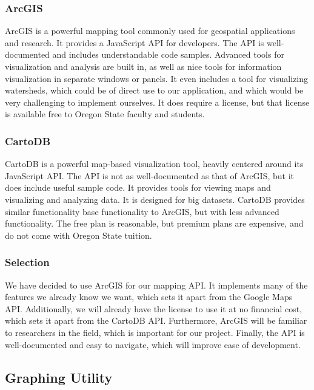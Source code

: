 \subsubsection{ArcGIS}
ArcGIS is a powerful mapping tool commonly used for geospatial applications and research. 
It provides a JavaScript API for developers. 
The API is well-documented and includes understandable code samples. 
Advanced tools for visualization and analysis are built in, as well as nice tools for information visualization in separate windows or panels. 
It even includes a tool for visualizing watersheds, which could be of direct use to our application, and which would be very challenging to implement ourselves. 
It does require a license, but that license is available free to Oregon State faculty and students. 

\subsubsection{CartoDB}
CartoDB is a powerful map-based visualization tool, heavily centered around its JavaScript API. 
The API is not as well-documented as that of ArcGIS, but it does include useful sample code. 
It provides tools for viewing maps and visualizing and analyzing data. 
It is designed for big datasets. 
CartoDB provides similar functionality base functionality to ArcGIS, but with less advanced functionality. 
The free plan is reasonable, but premium plans are expensive, and do not come with Oregon State tuition.

\subsubsection{Selection}
We have decided to use ArcGIS for our mapping API. 
It implements many of the features we already know we want, which sets it apart from the Google Maps API. 
Additionally, we will already have the license to use it at no financial cost, which sets it apart from the CartoDB API. 
Furthermore, ArcGIS will be familiar to researchers in the field, which is important for our project. 
Finally, the API is well-documented and easy to navigate, which will improve ease of development.


\subsection{Graphing Utility}
